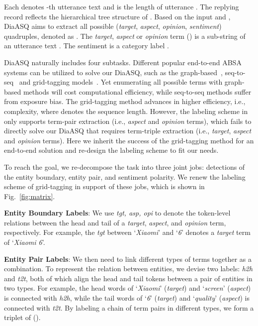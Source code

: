 \documentclass[11pt]{article}
\begin{document}
Each   denotes -th utterance text and  is the length of utterance .
The replying record  reflects the hierarchical tree structure of .
Based on the input  and , DiaASQ aims to extract all possible (\emph{target}, \emph{aspect}, \emph{opinion}, \emph{sentiment}) quadruples, denoted as .
The \emph{target}, \emph{aspect} or \emph{opinion} term () is a sub-string of an utterance text .
The sentiment  is a category label .

DiaASQ naturally includes four subtasks.
Different popular end-to-end ABSA systems can be utilized to solve our DiaASQ, such as the graph-based~\cite{zhu-tal-01-clser,ChenZFLW22}, seq-to-seq~\cite{Zhang0DBL20,mu-etal-21-pte} and grid-tagging models~\cite{wu-etal-2020-grid}.
Yet enumerating all possible terms with graph-based methods will cost computational efficiency, while seq-to-seq methods suffer from exposure bias.
The grid-tagging method advances in higher efficiency, i.e.,  complexity, where  denotes the sequence length.
However, the labeling scheme in~\cite{CaiXY20, ZhangD0YBL21} only supports term-pair extraction (i.e., \emph{aspect} and \emph{opinion} terms), which fails to directly solve our DiaASQ that requires term-triple extraction (i.e., \emph{target}, \emph{aspect} and \emph{opinion} terms).
Here we inherit the success of the grid-tagging method for an end-to-end solution and re-design the labeling scheme to fit our needs.

To reach the goal, we re-decompose the task into three joint jobs: detections of the entity boundary, entity pair, and sentiment polarity.
We renew the labeling scheme of grid-tagging in support of these jobs, which is shown in Fig.~\ref{fig:matrix}.

\vspace{2pt}
 \textbf{Entity Boundary Labels}:
We use \textit{tgt, asp, opi} to denote the token-level relations between the head and tail of a \emph{target}, \emph{aspect}, and \emph{opinion} term, respectively.
For example, the \textit{tgt} between `\emph{Xiaomi}' and `\emph{6}' denotes a \emph{target} term of `\emph{Xiaomi 6}'.

\vspace{2pt}
 \textbf{Entity Pair Labels}:
We then need to link different types of terms together as a combination.
To represent the relation between entities, we devise two labels: \emph{h2h} and \emph{t2t}, both of which align the head and tail tokens between a pair of entities in two types.
For example, the head words of `\emph{Xiaomi}' (\emph{target}) and `\emph{screen}' (\emph{aspect}) is connected with \emph{h2h}, while the tail words of `\emph{6}' (\emph{target}) and `\emph{quality}' (\emph{aspect}) is connected with \emph{t2t}.
By labeling a chain of term pairs in different types, we form a triplet of ().
\end{document}
